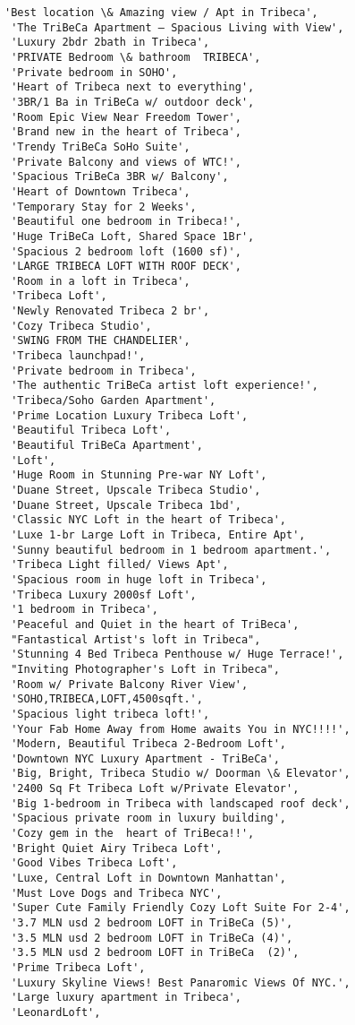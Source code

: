 \documentclass[11pt]{article}
\begin{document}
\begin{tcolorbox}[breakable, size=fbox, boxrule=.5pt, pad at break*=1mm, opacityfill=0]
\begin{Verbatim}[commandchars=\\\{\}]
 'Best location \& Amazing view / Apt in Tribeca',
 'The TriBeCa Apartment — Spacious Living with View',
 'Luxury 2bdr 2bath in Tribeca',
 'PRIVATE Bedroom \& bathroom  TRIBECA',
 'Private bedroom in SOHO',
 'Heart of Tribeca next to everything',
 '3BR/1 Ba in TriBeCa w/ outdoor deck',
 'Room Epic View Near Freedom Tower',
 'Brand new in the heart of Tribeca',
 'Trendy TriBeCa SoHo Suite',
 'Private Balcony and views of WTC!',
 'Spacious TriBeCa 3BR w/ Balcony',
 'Heart of Downtown Tribeca',
 'Temporary Stay for 2 Weeks',
 'Beautiful one bedroom in Tribeca!',
 'Huge TriBeCa Loft, Shared Space 1Br',
 'Spacious 2 bedroom loft (1600 sf)',
 'LARGE TRIBECA LOFT WITH ROOF DECK',
 'Room in a loft in Tribeca',
 'Tribeca Loft',
 'Newly Renovated Tribeca 2 br',
 'Cozy Tribeca Studio',
 'SWING FROM THE CHANDELIER',
 'Tribeca launchpad!',
 'Private bedroom in Tribeca',
 'The authentic TriBeCa artist loft experience!',
 'Tribeca/Soho Garden Apartment',
 'Prime Location Luxury Tribeca Loft',
 'Beautiful Tribeca Loft',
 'Beautiful TriBeCa Apartment',
 'Loft',
 'Huge Room in Stunning Pre-war NY Loft',
 'Duane Street, Upscale Tribeca Studio',
 'Duane Street, Upscale Tribeca 1bd',
 'Classic NYC Loft in the heart of Tribeca',
 'Luxe 1-br Large Loft in Tribeca, Entire Apt',
 'Sunny beautiful bedroom in 1 bedroom apartment.',
 'Tribeca Light filled/ Views Apt',
 'Spacious room in huge loft in Tribeca',
 'Tribeca Luxury 2000sf Loft',
 '1 bedroom in Tribeca',
 'Peaceful and Quiet in the heart of TriBeca',
 "Fantastical Artist's loft in Tribeca",
 'Stunning 4 Bed Tribeca Penthouse w/ Huge Terrace!',
 "Inviting Photographer's Loft in Tribeca",
 'Room w/ Private Balcony River View',
 'SOHO,TRIBECA,LOFT,4500sqft.',
 'Spacious light tribeca loft!',
 'Your Fab Home Away from Home awaits You in NYC!!!!',
 'Modern, Beautiful Tribeca 2-Bedroom Loft',
 'Downtown NYC Luxury Apartment - TriBeCa',
 'Big, Bright, Tribeca Studio w/ Doorman \& Elevator',
 '2400 Sq Ft Tribeca Loft w/Private Elevator',
 'Big 1-bedroom in Tribeca with landscaped roof deck',
 'Spacious private room in luxury building',
 'Cozy gem in the  heart of TriBeca!!',
 'Bright Quiet Airy Tribeca Loft',
 'Good Vibes Tribeca Loft',
 'Luxe, Central Loft in Downtown Manhattan',
 'Must Love Dogs and Tribeca NYC',
 'Super Cute Family Friendly Cozy Loft Suite For 2-4',
 '3.7 MLN usd 2 bedroom LOFT in TriBeCa (5)',
 '3.5 MLN usd 2 bedroom LOFT in TriBeCa (4)',
 '3.5 MLN usd 2 bedroom LOFT in TriBeCa  (2)',
 'Prime Tribeca Loft',
 'Luxury Skyline Views! Best Panaromic Views Of NYC.',
 'Large luxury apartment in Tribeca',
 'LeonardLoft',

\end{Verbatim}
\end{tcolorbox}
\end{document}
